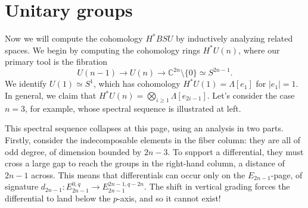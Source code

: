 \advancetoleft
\advancetoleft
\section{Unitary groups}
\vspace*{\fill}
Now we will compute the cohomology $H^* BSU$ by
    inductively analyzing related spaces.  We begin by computing the cohomology
    rings $H^* U(n)$, where our primary tool is the fibration \[U(n-1) \to
    U(n) \to \mathbb{C}^{2n} \setminus \{0\} \simeq S^{2n-1}.\]  We
    identify $U(1) \simeq S^1$, which has cohomology $H^* U(1) = \Lambda[e_1]$
    for $|e_1| = 1$.  In general, we claim that $H^* U(n) = \bigotimes_{i \ge
    1} \Lambda[e_{2i-1}]$.  Let's consider the case $n = 3$, for example, whose
    spectral sequence is illustrated at left.
    
    This spectral sequence collapses at this page, using an analysis in two
    parts.  Firstly, consider the indecomposable elements in the fiber column:
    they are all of odd degree, of dimension bounded by $2n-3$.  To support a
    differential, they must cross a large gap to reach the groups in the
    right-hand column, a distance of $2n-1$ across.  This means that
    differentials can occur only on the $E_{2n-1}$-page, of signature $d_{2n-1}:
    E_{2n-1}^{0, q} \to E_{2n-1}^{2n-1, q - 2n}$.  The shift in vertical
    grading forces the differential to land below the $p$-axis, and so it cannot
    exist!

